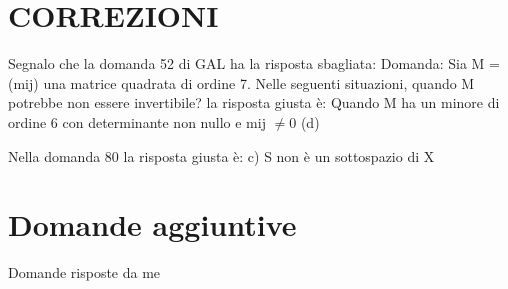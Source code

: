 \documentclass[12pt, a4paper, openany]{book}
\begin{document}
\chapter{CORREZIONI}
Segnalo che la domanda 52 di GAL ha la risposta sbagliata:
Domanda: Sia M = (mij) una matrice quadrata di ordine 7. Nelle seguenti situazioni, quando M potrebbe non essere invertibile?
la risposta giusta è: Quando M ha un minore di ordine 6 con determinante non nullo e mij $\neq 0$ (d)

Nella domanda 80 la risposta giusta è: c) S non è un sottospazio di X

\chapter{Domande aggiuntive} 
Domande risposte da me
\end{document}
